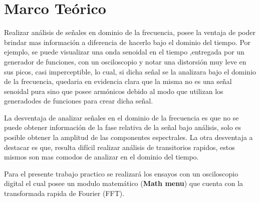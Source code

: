   \section{Marco Teórico}

    Realizar análisis de señales en dominio de la frecuencia, posee la ventaja de poder 
    brindar mas información a diferencia de hacerlo bajo el dominio del tiempo. 
    Por ejemplo, se puede visualizar una onda senoidal en el tiempo ,entregada 
    por un generador de funciones, con un osciloscopio y notar una distorsión muy leve 
    en sus picos, casi imperceptible, lo cual, si dicha señal se la analizara bajo el 
    dominio de la frecuencia, quedaria en evidencia clara que la misma no es una señal 
    senoidal pura sino que posee armónicos debido al modo que utilizan los generadodes 
    de funciones para crear dicha señal.
    
    La desventaja de analizar señales en el 
    dominio de la frecuencia es que no se puede obtener información de la fase relativa de 
    la señal bajo análisis, solo es posible obtener la amplitud de las componentes
    espectrales. La otra desventaja a destacar es que, resulta difícil realizar análisis de 
    transitorios rapidos, estos mismos son mas comodos de analizar en el dominio del tiempo.
    
    Para el presente trabajo practico se realizará los ensayos con un osciloscopio digital 
    el cual posee un modulo matemático (\textbf{Math menu}) que cuenta con la transformada 
    rapida de Fourier (FFT). 

        
    




